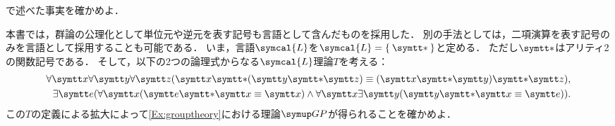 \begin{Que} \label{Que:equivalentTheory}
	で述べた事実を確かめよ．
\end{Que}

\begin{Que} \label{Que:grouptheoryaxiomization}
	本書では，群論の公理化として単位元や逆元を表す記号も言語として含んだものを採用した．
	別の手法としては，二項演算を表す記号のみを言語として採用することも可能である．
	いま，言語\(\symcal{L}\)を\(\symcal{L} = \Set{\obj{\ast}}\)と定める．
	ただし\(\obj{\ast}\)はアリティ2の関数記号である．
	そして，以下の2つの論理式からなる\(\symcal{L}\)理論\(T\)を考える：
	\begin{align*}
		\forall \obj{x} \forall \obj{y} \forall \obj{z} \paren{\obj{x} \obj{\ast} \paren{\obj{y} \obj{\ast} \obj{z}} \objeq \paren{\obj{x} \obj{\ast} \obj{y}} \obj{\ast} \obj{z}}, \\
		\exists \obj{e} \paren{\forall \obj{x} \paren{\obj{e} \obj{\ast} \obj{x} \objeq \obj{x}} \land \forall \obj{x} \exists \obj{y} \paren{\obj{y} \obj{\ast} \obj{x} \objeq \obj{e}}}.
	\end{align*}
	この\(T\)の定義による拡大によって\cref{Ex:grouptheory}における理論\(\GP\)が得られることを確かめよ．
\end{Que}